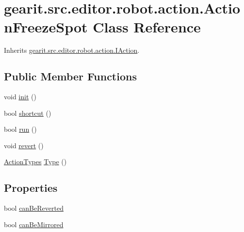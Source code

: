 \hypertarget{classgearit_1_1src_1_1editor_1_1robot_1_1action_1_1_action_freeze_spot}{\section{gearit.\+src.\+editor.\+robot.\+action.\+Action\+Freeze\+Spot Class Reference}
\label{classgearit_1_1src_1_1editor_1_1robot_1_1action_1_1_action_freeze_spot}
}


Inherits \hyperlink{interfacegearit_1_1src_1_1editor_1_1robot_1_1action_1_1_i_action}{gearit.\+src.\+editor.\+robot.\+action.\+I\+Action}.

\subsection*{Public Member Functions}
\begin{DoxyCompactItemize}
\item 
void \hyperlink{classgearit_1_1src_1_1editor_1_1robot_1_1action_1_1_action_freeze_spot_aed6fc0a8036ab3e6bc0b2d40e28195ed}{init} ()
\item 
bool \hyperlink{classgearit_1_1src_1_1editor_1_1robot_1_1action_1_1_action_freeze_spot_ad1e595cde52ae169d34a95e24978a445}{shortcut} ()
\item 
bool \hyperlink{classgearit_1_1src_1_1editor_1_1robot_1_1action_1_1_action_freeze_spot_ab8cb72df00900b37ee18615b001b1e9f}{run} ()
\item 
void \hyperlink{classgearit_1_1src_1_1editor_1_1robot_1_1action_1_1_action_freeze_spot_a32a4d49b7ef71496f8aed245b834684f}{revert} ()
\item 
\hyperlink{namespacegearit_1_1src_1_1editor_1_1robot_1_1action_a4be0fd46e3952d6135136b20e7b3fc5e}{Action\+Types} \hyperlink{classgearit_1_1src_1_1editor_1_1robot_1_1action_1_1_action_freeze_spot_a3f2e8acc326bba0d335078e87325770e}{Type} ()
\end{DoxyCompactItemize}
\subsection*{Properties}
\begin{DoxyCompactItemize}
\item 
bool \hyperlink{classgearit_1_1src_1_1editor_1_1robot_1_1action_1_1_action_freeze_spot_a13eb5d3d1682cc400c3356ea69814193}{can\+Be\+Reverted}
\item 
bool \hyperlink{classgearit_1_1src_1_1editor_1_1robot_1_1action_1_1_action_freeze_spot_a653f1626c6d31a9a9455fc5865033704}{can\+Be\+Mirrored}
\end{DoxyCompactItemize}


